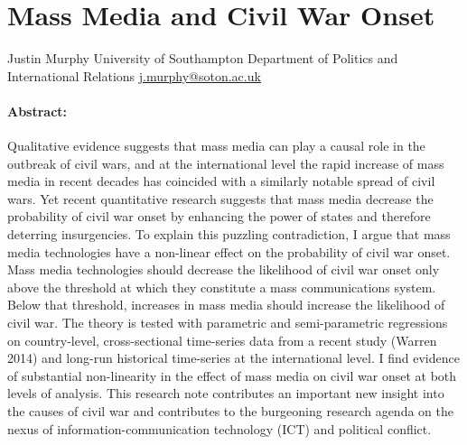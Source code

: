 \documentclass[11pt,article,oneside]{memoir}
\author{}
\date{}
\begin{document}
  
\setsansfont[Mapping=tex-text]{Gill Sans} 
\setmonofont[Mapping=tex-text,Scale=0.8]{Consolas}
\pagestyle{kjh}

\singlespacing





\thispagestyle{empty}

\section{Mass Media and Civil War
Onset}\label{mass-media-and-civil-war-onset}

Justin Murphy \newline
University of Southampton \newline     
Department of Politics and International Relations \newline     
\href{mailto:j.murphy@soton.ac.uk}{j.murphy@soton.ac.uk} \newline    

\paragraph{Abstract:}\label{abstract}

Qualitative evidence suggests that mass media can play a causal role in
the outbreak of civil wars, and at the international level the rapid
increase of mass media in recent decades has coincided with a similarly
notable spread of civil wars. Yet recent quantitative research suggests
that mass media decrease the probability of civil war onset by enhancing
the power of states and therefore deterring insurgencies. To explain
this puzzling contradiction, I argue that mass media technologies have a
non-linear effect on the probability of civil war onset. Mass media
technologies should decrease the likelihood of civil war onset only
above the threshold at which they constitute a mass communications
system. Below that threshold, increases in mass media should increase
the likelihood of civil war. The theory is tested with parametric and
semi-parametric regressions on country-level, cross-sectional
time-series data from a recent study (Warren 2014) and long-run
historical time-series at the international level. I find evidence of
substantial non-linearity in the effect of mass media on civil war onset
at both levels of analysis. This research note contributes an important
new insight into the causes of civil war and contributes to the
burgeoning research agenda on the nexus of information-communication
technology (ICT) and political conflict.\newline
\end{document}
